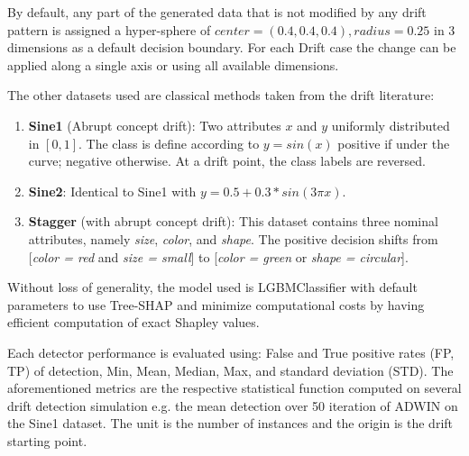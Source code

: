 \documentclass[runningheads]{llncs}
\begin{document}
By default, any part of the generated data that is not modified by any drift pattern is assigned a hyper-sphere of $center=(0.4, 0.4, 0.4), radius = 0.25$ in 3 dimensions as a default decision boundary. For each Drift case the change can be applied along a single axis or using all available dimensions.

The other datasets used are classical methods taken from the drift literature:
\begin{enumerate}
    \item \textbf{Sine1} (Abrupt concept drift): Two attributes $x$ and $y$ uniformly distributed in $[0, 1]$. The class is define according to $y = sin(x)$ positive if under the curve; negative otherwise. At a drift point, the class labels are reversed.
    \item \textbf{Sine2}: Identical to Sine1 with $y = 0.5 + 0.3 * sin(3 \pi x)$.
    \item \textbf{Stagger} (with abrupt concept drift): This dataset contains three nominal attributes, namely \emph{size}, \emph{color}, and \emph{shape}. The positive decision shifts from [\emph{color = red} and \emph{size = small}] to [\emph{color = green} or \emph{shape = circular}].
\end{enumerate}
 
Without loss of generality, the model used is LGBMClassifier \cite{lgbm} with default parameters to use Tree-SHAP and minimize computational costs by having efficient computation of exact Shapley values. 


Each detector performance is evaluated using: False and True positive rates (FP, TP) of detection, Min, Mean, Median, Max, and standard deviation (STD). The aforementioned metrics are the respective statistical function computed on several drift detection simulation e.g. the mean detection over 50 iteration of ADWIN on the Sine1 dataset. The unit is the number of instances and the origin is the drift starting point. 
\end{document}
